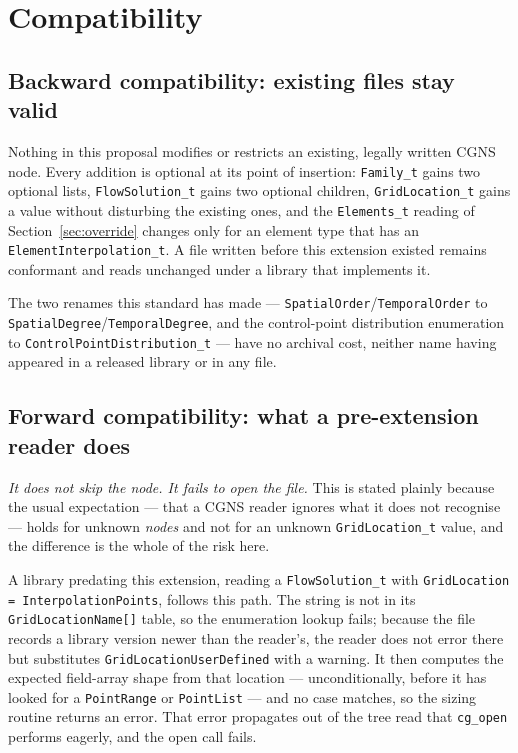 \documentclass[11pt,letterpaper]{article}
\newif\ifvfourdraft
\newenvironment{v4block}{\ifvfourdraft\color{v4violet}\fi\ignorespaces}{\par}
\newcommand{\vfourmark}{\ifvfourdraft\textcolor{v4violet}{\textbf{[v4]}}\ \fi}
\begin{document}
\begin{v4block}
\section{\vfourmark Compatibility}
\label{sec:compatibility}

\subsection{Backward compatibility: existing files stay valid}

Nothing in this proposal modifies or restricts an existing, legally written CGNS
node.  Every addition is optional at its point of insertion: \texttt{Family\_t}
gains two optional lists, \texttt{FlowSolution\_t} gains two optional children,
\texttt{GridLocation\_t} gains a value without disturbing the existing ones, and
the \texttt{Elements\_t} reading of Section~\ref{sec:override} changes only for an
element type that has an \texttt{ElementInterpolation\_t}.  A file written before
this extension existed remains conformant and reads unchanged under a library that
implements it.

The two renames this standard has made --- \texttt{SpatialOrder}/\texttt{TemporalOrder}
to \texttt{SpatialDegree}/\texttt{TemporalDegree}, and the control-point
distribution enumeration to \texttt{ControlPointDistribution\_t} --- have no
archival cost, neither name having appeared in a released library or in any file.

\subsection{Forward compatibility: what a pre-extension reader does}

\emph{It does not skip the node.  It fails to open the file.}  This is stated
plainly because the usual expectation --- that a CGNS reader ignores what it does
not recognise --- holds for unknown \emph{nodes} and not for an unknown
\texttt{GridLocation\_t} value, and the difference is the whole of the risk here.

A library predating this extension, reading a \texttt{FlowSolution\_t} with
\texttt{GridLocation = InterpolationPoints}, follows this path.  The string is not
in its \texttt{GridLocationName[]} table, so the enumeration lookup fails; because
the file records a library version newer than the reader's, the reader does not
error there but substitutes \texttt{GridLocationUserDefined} with a warning.  It
then computes the expected field-array shape from that location --- unconditionally,
before it has looked for a \texttt{PointRange} or \texttt{PointList} --- and no case
matches, so the sizing routine returns an error.  That error propagates out of the
tree read that \texttt{cg\_open} performs eagerly, and the open call fails.


\end{v4block}
\end{document}
